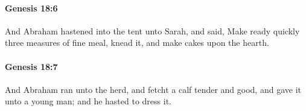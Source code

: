 		\paragraph{Genesis 18:6} %
			\label{GENESIS-18-6}

			And Abraham hastened into the tent unto Sarah, and said, Make ready quickly three measures of fine meal, knead it, and make cakes upon the hearth.


		\paragraph{Genesis 18:7} %
			\label{GENESIS-18-7}

			And Abraham ran unto the herd, and fetcht a calf tender and good, and gave it unto a young man; and he hasted to dress it.


